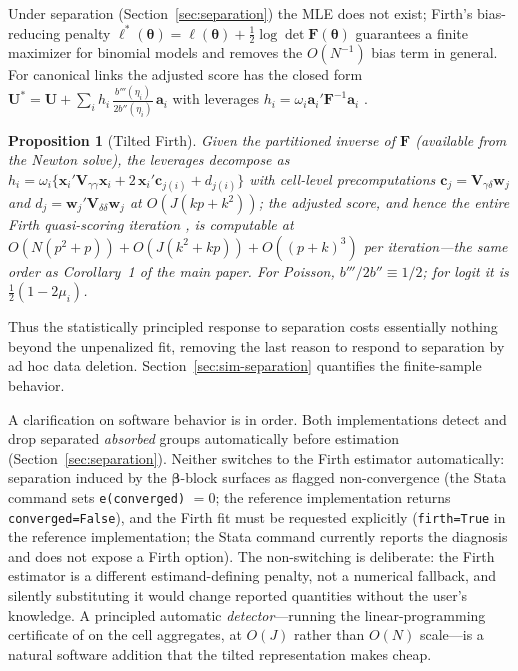 \documentclass[11pt]{article}
\newtheorem{proposition}{Proposition}
\newcommand{\bbeta}{\bm{\beta}}
\newcommand{\btheta}{\bm{\theta}}
\newcommand{\bx}{\mathbf{x}}
\newcommand{\bw}{\mathbf{w}}
\newcommand{\ba}{\mathbf{a}}
\newcommand{\bc}{\mathbf{c}}
\newcommand{\bF}{\mathbf{F}}
\newcommand{\bU}{\mathbf{U}}
\newcommand{\bV}{\mathbf{V}}
\begin{document}
Under separation (Section~\ref{sec:separation}) the MLE does not exist;
Firth's bias-reducing penalty $\ell^\ast(\btheta) = \ell(\btheta) +
\tfrac12 \log\det \bF(\btheta)$ \citep{firth1993} guarantees a finite
maximizer for binomial models \citep{heinze2002} and removes the
$O(N^{-1})$ bias term in general.  For canonical links the adjusted score
has the closed form
$\bU^\ast = \bU + \sum_i h_i\, \frac{b'''(\eta_i)}{2 b''(\eta_i)}\,
\ba_i$ with leverages $h_i = \omega_i \ba_i' \bF^{-1} \ba_i$
\citep{firth1993,kosmidis2009}.

\begin{proposition}[Tilted Firth]\label{prop:firth}
Given the partitioned inverse of $\bF$ (available from the Newton solve),
the leverages decompose as
$h_i = \omega_i \{ \bx_i' \bV_{\gamma\gamma} \bx_i
 + 2\, \bx_i' \bc_{j(i)} + d_{j(i)} \}$ with cell-level precomputations
$\bc_j = \bV_{\gamma\delta} \bw_j$ and
$d_j = \bw_j' \bV_{\delta\delta} \bw_j$ at $O(J(kp + k^2))$; the adjusted
score, and hence the entire Firth quasi-scoring iteration
\citep{kosmidis2009}, is computable at
$O(N(p^2+p)) + O(J(k^2+kp)) + O((p+k)^3)$ per iteration---the same order
as Corollary~1 of the main paper.  For Poisson,
$b'''/2b'' \equiv 1/2$; for logit it is $\tfrac12(1 - 2\mu_i)$.
\end{proposition}

Thus the statistically principled response to separation costs
essentially nothing beyond the unpenalized fit, removing the last reason
to respond to separation by ad hoc data deletion.
Section~\ref{sec:sim-separation} quantifies the finite-sample behavior.

A clarification on software behavior is in order.  Both implementations
detect and drop separated \emph{absorbed} groups automatically before
estimation (Section~\ref{sec:separation}).  Neither switches to the
Firth estimator automatically: separation induced by the $\bbeta$-block
surfaces as flagged non-convergence (the Stata command sets
\texttt{e(converged)} $= 0$; the reference implementation returns
\texttt{converged=False}), and the Firth fit must be requested
explicitly (\texttt{firth=True} in the reference implementation; the
Stata command currently reports the diagnosis and does not expose a
Firth option).  The non-switching is deliberate: the Firth estimator is
a different estimand-defining penalty, not a numerical fallback, and
silently substituting it would change reported quantities without the
user's knowledge.  A principled automatic \emph{detector}---running the
linear-programming certificate of \citet{correia2019} on the cell
aggregates, at $O(J)$ rather than $O(N)$ scale---is a natural software
addition that the tilted representation makes cheap.
\end{document}
